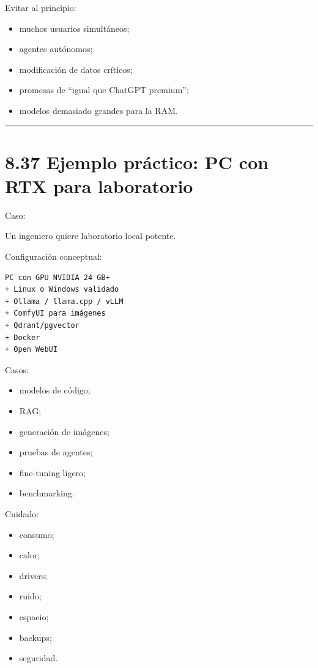 Evitar al principio:

\begin{itemize}
\tightlist
\item
  muchos usuarios simultáneos;
\item
  agentes autónomos;
\item
  modificación de datos críticos;
\item
  promesas de ``igual que ChatGPT premium'';
\item
  modelos demasiado grandes para la RAM.
\end{itemize}

\begin{center}\rule{0.5\linewidth}{0.5pt}\end{center}

\section{8.37 Ejemplo práctico: PC con RTX para
laboratorio}\label{ejemplo-pruxe1ctico-pc-con-rtx-para-laboratorio}

Caso:

Un ingeniero quiere laboratorio local potente.

Configuración conceptual:

\begin{lstlisting}
PC con GPU NVIDIA 24 GB+
+ Linux o Windows validado
+ Ollama / llama.cpp / vLLM
+ ComfyUI para imágenes
+ Qdrant/pgvector
+ Docker
+ Open WebUI
\end{lstlisting}

Casos:

\begin{itemize}
\tightlist
\item
  modelos de código;
\item
  RAG;
\item
  generación de imágenes;
\item
  pruebas de agentes;
\item
  fine-tuning ligero;
\item
  benchmarking.
\end{itemize}

Cuidado:

\begin{itemize}
\tightlist
\item
  consumo;
\item
  calor;
\item
  drivers;
\item
  ruido;
\item
  espacio;
\item
  backups;
\item
  seguridad.
\end{itemize}

